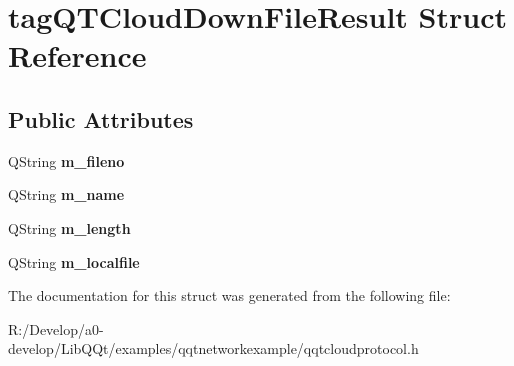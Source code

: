 \hypertarget{structtag_q_t_cloud_down_file_result}{}\section{tag\+Q\+T\+Cloud\+Down\+File\+Result Struct Reference}
\label{structtag_q_t_cloud_down_file_result}
\subsection*{Public Attributes}
\begin{DoxyCompactItemize}
\item 
\mbox{\label{structtag_q_t_cloud_down_file_result_a2610c1be9307d2c90c899b645a6256d8}} 
Q\+String {\bfseries m\+\_\+fileno}
\item 
\mbox{\label{structtag_q_t_cloud_down_file_result_a7c3e98acec1cc11edc86688d8755cd13}} 
Q\+String {\bfseries m\+\_\+name}
\item 
\mbox{\label{structtag_q_t_cloud_down_file_result_a35a755479fed235dd7a5c61301d81c11}} 
Q\+String {\bfseries m\+\_\+length}
\item 
\mbox{\label{structtag_q_t_cloud_down_file_result_a2f2066fc9481acd98fe7ab66fbd2b0a0}} 
Q\+String {\bfseries m\+\_\+localfile}
\end{DoxyCompactItemize}


The documentation for this struct was generated from the following file\+:\begin{DoxyCompactItemize}
\item 
R\+:/\+Develop/a0-\/develop/\+Lib\+Q\+Qt/examples/qqtnetworkexample/qqtcloudprotocol.\+h\end{DoxyCompactItemize}

